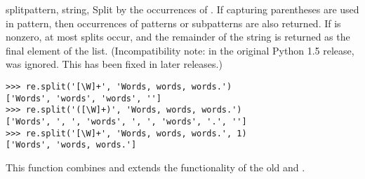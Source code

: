 \begin{funcdesc}{split}{pattern, string, }
  Split  by the occurrences of .  If
  capturing parentheses are used in pattern, then occurrences of
  patterns or subpatterns are also returned.
  If  is nonzero, at most  splits
  occur, and the remainder of the string is returned as the final
  element of the list.  (Incompatibility note: in the original Python
  1.5 release,  was ignored.  This has been fixed in
  later releases.)
%
\begin{verbatim}
>>> re.split('[\W]+', 'Words, words, words.')
['Words', 'words', 'words', '']
>>> re.split('([\W]+)', 'Words, words, words.')
['Words', ', ', 'words', ', ', 'words', '.', '']
>>> re.split('[\W]+', 'Words, words, words.', 1)
['Words', 'words, words.']
\end{verbatim}
%
  This function combines and extends the functionality of
  the old  and .
\end{funcdesc}

